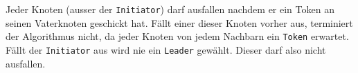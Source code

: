Jeder Knoten (ausser der \verb+Initiator+) darf ausfallen nachdem er ein Token
an seinen Vaterknoten geschickt hat. Fällt einer dieser Knoten vorher aus,
terminiert der Algorithmus nicht, da jeder Knoten von jedem Nachbarn ein
\verb+Token+ erwartet. Fällt der \verb+Initiator+ aus wird nie ein \verb+Leader+
gewählt. Dieser darf also nicht ausfallen.
